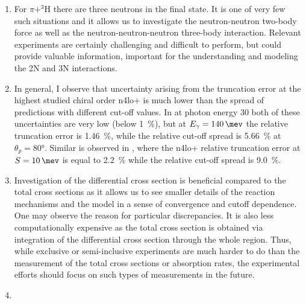 \begin{enumerate}
    \item For $\pi + ^3$H there are three neutrons in the final state. It is one of very few such situations and it allows us to investigate the
    neutron-neutron two-body force as well as the neutron-neutron-neutron three-body interaction. 
    Relevant  experiments are certainly challenging and difficult to perform, but
    could provide valuable information, important for the understanding and modeling
    the 2N and 3N interactions.
    \item In general, I observe that uncertainty arising from the truncation error at the highest
    studied chiral order \gls{n4lo+} is much lower than the spread of predictions with different
    cut-off values. In  at photon energy \SI{30}{\mev} both of these
    uncertainties are very low (below \SI{1}{\percent}), but at $E_\gamma=\SI{140}{\mev}$
    the relative truncation error is \SI{1.46}{\percent}, while the relative cut-off spread is 
    \SI{5.66}{\percent} at $\theta_p= \ang{80}$.
    Similar is observed in , where the \gls{n4lo+} relative 
    truncation error at $S=\SI{10}{\mev}$ is equal to \SI{2.2}{\percent} while
    the relative cut-off spread is \SI{9.0}{\percent}.
    \item Investigation of the differential cross section is beneficial compared to the total cross sections as it allows us to see smaller details of the reaction mechanisms and the model in a sense of convergence and cutoff dependence. One may observe the reason for particular discrepancies.
    It is also less computationally expensive as the total cross section is obtained via integration of the differential cross section through the whole region.
    Thus, while exclusive or semi-inclusive experiments are much harder to do than the measurement of the total
    cross sections or absorption rates, the experimental efforts should focus on such types of measurements in the future. 
    \item {}

\end{enumerate}
